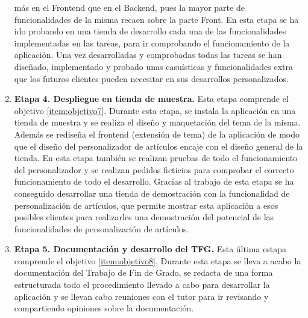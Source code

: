 \documentclass[12pt]{article}
\begin{document}
\begin{enumerate}[label={\textbf{\textbullet}}]
    más en el Frontend que en el Backend, pues la mayor parte de funcionalidades de la misma recaen sobre la parte Front. En esta etapa se ha ido probando en una tienda de desarrollo cada una de las funcionalidades implementadas en las tareas, 
    para ir comprobando el funcionamiento de la aplicación. Una vez desarrolladas y comprobadas todas las tareas se han diseñado, implementado y probado unas casuísticas y funcionalidades
    extra que los futuros clientes pueden necesitar en sus desarrollos personalizados.
    \item \textbf{Etapa 4. Despliegue en tienda de muestra.} Esta etapa comprende el objetivo \ref{item:objetivo7}. 
    Durante esta etapa, se instala la aplicación en una tienda de muestra y se realiza el diseño y maquetación del tema de la misma. Además se rediseña el frontend (extensión de tema) de la aplicación de modo que el diseño del personalizador de artículos
    encaje con el diseño general de la tienda. En esta etapa también se realizan pruebas de todo el funcionamiento del personalizador y se realizan pedidos ficticios para comprobar el correcto
    funcionamiento de todo el desarrollo. Gracias al trabajo de esta etapa se ha conseguido desarrollar una tienda de demostración con la funcionalidad de personalización de artículos, que permite
    mostrar esta aplicación a esos posibles clientes para realizarles una demostración del potencial de las funcionalidades de personalización de artículos.
    \item \textbf{Etapa 5. Documentación y desarrollo del TFG.} Esta última estapa comprende el objetivo \ref{item:objetivo8}. Durante esta etapa
    se lleva a acabo la documentación del Trabajo de Fin de Grado, se redacta de una forma estructurada todo el procedimiento llevado a cabo para desarrollar
    la aplicación y se llevan cabo reuniones con el tutor para ir revisando y compartiendo opiniones sobre la documentación.
\end{enumerate}
\end{document}
